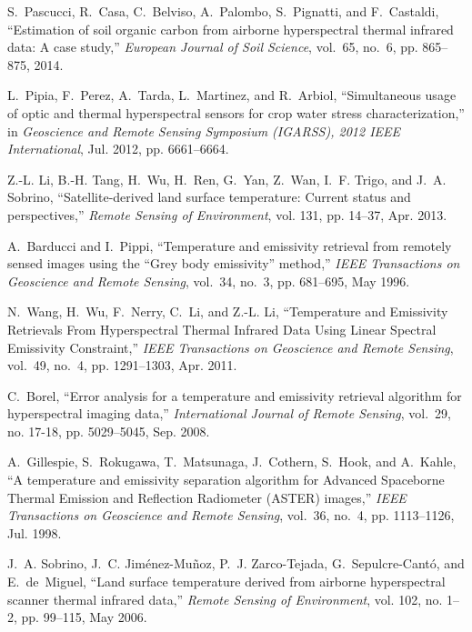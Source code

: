 \begin{thebibliography}{10}
S.~Pascucci, R.~Casa, C.~Belviso, A.~Palombo, S.~Pignatti, and F.~Castaldi,
  ``Estimation of soil organic carbon from
  airborne hyperspectral thermal infrared data: {A} case study,''
  \emph{European Journal of Soil Science},
  vol.~65, no.~6, pp. 865--875, 2014.

L.~Pipia, F.~Perez, A.~Tarda, L.~Martinez, and R.~Arbiol, ``Simultaneous usage
  of optic and thermal hyperspectral sensors for crop water stress
  characterization,'' in \emph{Geoscience and {Remote} {Sensing} {Symposium}
  ({IGARSS}), 2012 {IEEE} {International}}, Jul. 2012, pp. 6661--6664.

Z.-L. Li, B.-H. Tang, H.~Wu, H.~Ren, G.~Yan, Z.~Wan, I.~F. Trigo, and J.~A.
  Sobrino, ``Satellite-derived land surface temperature: {Current} status and
  perspectives,'' \emph{Remote Sensing of Environment}, vol. 131, pp. 14--37,
  Apr. 2013.

A.~Barducci and I.~Pippi, ``Temperature and emissivity retrieval from remotely
  sensed images using the ``{Grey} body emissivity'' method,'' \emph{IEEE
  Transactions on Geoscience and Remote Sensing}, vol.~34, no.~3, pp. 681--695,
  May 1996.

N.~Wang, H.~Wu, F.~Nerry, C.~Li, and Z.-L. Li, ``Temperature and {Emissivity}
  {Retrievals} {From} {Hyperspectral} {Thermal} {Infrared} {Data} {Using}
  {Linear} {Spectral} {Emissivity} {Constraint},'' \emph{IEEE Transactions on
  Geoscience and Remote Sensing}, vol.~49, no.~4, pp. 1291--1303, Apr. 2011.

C.~Borel, ``Error analysis for a temperature and emissivity retrieval algorithm
  for hyperspectral imaging data,'' \emph{International Journal of Remote
  Sensing}, vol.~29, no. 17-18, pp. 5029--5045, Sep. 2008.

A.~Gillespie, S.~Rokugawa, T.~Matsunaga, J.~Cothern, S.~Hook, and A.~Kahle, ``A
  temperature and emissivity separation algorithm for {Advanced} {Spaceborne}
  {Thermal} {Emission} and {Reflection} {Radiometer} ({ASTER}) images,''
  \emph{IEEE Transactions on Geoscience and Remote Sensing}, vol.~36, no.~4,
  pp. 1113--1126, Jul. 1998.

J.~A. Sobrino, J.~C. Jim\'{e}nez-Mu\~{n}oz, P.~J. Zarco-Tejada,
  G.~Sepulcre-Cant\'{o}, and E.~de~Miguel, ``Land surface temperature derived
  from airborne hyperspectral scanner thermal infrared data,'' \emph{Remote
  Sensing of Environment}, vol. 102, no. 1–2, pp. 99--115, May 2006.


\end{thebibliography}
